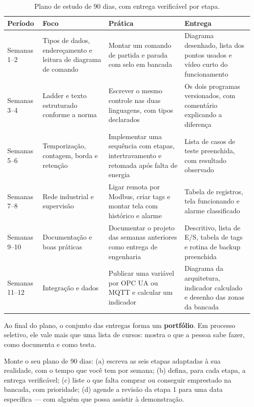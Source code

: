 \begin{table}[H]
  \centering
  \caption{Plano de estudo de 90 dias, com entrega verificável por etapa.}
  \label{tab:plano-90-dias}
  \begin{tabular}{p{1.8cm} p{4.2cm} p{3.8cm} p{4.5cm}}
    \toprule
    Período & Foco & Prática & Entrega \\
    \midrule
    Semanas 1--2
      & Tipos de dados, endereçamento e leitura de diagrama de comando
      & Montar um comando de partida e parada com selo em bancada
      & Diagrama desenhado, lista dos pontos usados e vídeo curto do funcionamento \\
    \addlinespace
    Semanas 3--4
      & Ladder e texto estruturado conforme a norma
      & Escrever o mesmo controle nas duas linguagens, com tipos declarados
      & Os dois programas versionados, com comentário explicando a diferença \\
    \addlinespace
    Semanas 5--6
      & Temporização, contagem, borda e retenção
      & Implementar uma sequência com etapas, intertravamento e retomada após falta de energia
      & Lista de casos de teste preenchida, com resultado observado \\
    \addlinespace
    Semanas 7--8
      & Rede industrial e supervisão
      & Ligar remota por Modbus, criar tags e montar tela com histórico e alarme
      & Tabela de registros, tela funcionando e alarme classificado \\
    \addlinespace
    Semanas 9--10
      & Documentação e boas práticas
      & Documentar o projeto das semanas anteriores como entrega de engenharia
      & Descritivo, lista de E/S, tabela de tags e rotina de backup preenchida \\
    \addlinespace
    Semanas 11--12
      & Integração e dados
      & Publicar uma variável por OPC UA ou MQTT e calcular um indicador
      & Diagrama da arquitetura, indicador calculado e desenho das zonas da bancada \\
    \bottomrule
  \end{tabular}
\end{table}

Ao final do plano, o conjunto das entregas forma um \textbf{portfólio}. Em processo seletivo, ele vale
mais que uma lista de cursos: mostra o que a pessoa sabe fazer, como documenta e como testa.

\begin{pratica}
Monte o seu plano de 90 dias:
(a) escreva as seis etapas adaptadas à sua realidade, com o tempo que você tem por semana;
(b) defina, para cada etapa, a entrega verificável;
(c) liste o que falta comprar ou conseguir emprestado na bancada, com prioridade;
(d) agende a revisão da etapa 1 para uma data específica --- com alguém que possa assistir à
demonstração.
\end{pratica}

